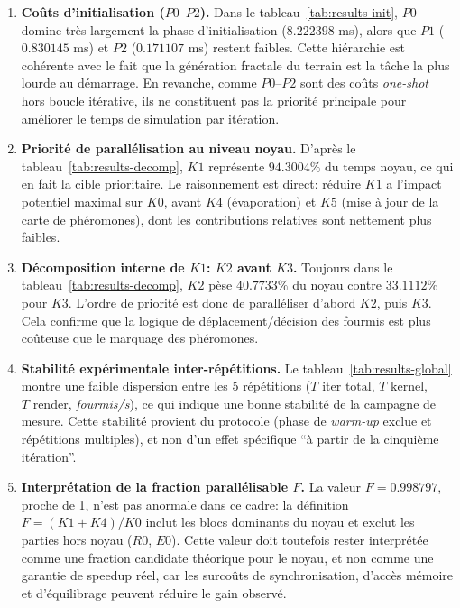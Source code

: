 \begin{enumerate}[leftmargin=*]
    \item \textbf{Coûts d'initialisation (\(P0\text{--}P2\)).}
    Dans le tableau~\ref{tab:results-init}, \(P0\) domine très largement la phase
    d'initialisation (\(8.222398\) ms), alors que \(P1\)
    (\(0.830145\) ms) et \(P2\) (\(0.171107\) ms) restent faibles. Cette hiérarchie est cohérente
    avec le fait que la génération fractale du terrain est la tâche la plus lourde au démarrage.
    En revanche, comme \(P0\text{--}P2\) sont des coûts \textit{one-shot} hors boucle itérative,
    ils ne constituent pas la priorité principale pour améliorer le temps de simulation par itération.

    \item \textbf{Priorité de parallélisation au niveau noyau.}
    D'après le tableau~\ref{tab:results-decomp}, \(K1\) représente \(94.3004\%\) du temps noyau,
    ce qui en fait la cible prioritaire.
    Le raisonnement est direct: réduire \(K1\) a l'impact potentiel maximal sur \(K0\),
    avant \(K4\) (évaporation) et \(K5\) (mise à jour de la carte de phéromones), dont les
    contributions relatives sont nettement plus faibles.

    \item \textbf{Décomposition interne de \(K1\): \(K2\) avant \(K3\).}
    Toujours dans le tableau~\ref{tab:results-decomp}, \(K2\) pèse \(40.7733\%\) du noyau contre
    \(33.1112\%\) pour \(K3\).
    L'ordre de priorité est donc de paralléliser d'abord \(K2\), puis \(K3\).
    Cela confirme que la logique de déplacement/décision des fourmis est plus coûteuse que le
    marquage des phéromones.

    \item \textbf{Stabilité expérimentale inter-répétitions.}
    Le tableau~\ref{tab:results-global} montre une faible dispersion entre les 5 répétitions
    (\(T\_\text{iter\_total}\), \(T\_\text{kernel}\), \(T\_\text{render}\), \textit{fourmis/s}),
    ce qui indique une bonne stabilité de la campagne de mesure. Cette stabilité provient du protocole
    (phase de \textit{warm-up} exclue et répétitions multiples), et non d'un effet spécifique
    ``à partir de la cinquième itération''.

    \item \textbf{Interprétation de la fraction parallélisable \(F\).}
    La valeur \(F = 0.998797\), proche de 1, n'est pas anormale dans ce cadre:
    la définition \(F=(K1+K4)/K0\) inclut les blocs dominants du noyau et exclut les
    parties hors noyau (\(R0\), \(E0\)). Cette valeur doit toutefois rester interprétée
    comme une fraction candidate théorique pour le noyau, et non comme une garantie de
    speedup réel, car les surcoûts de synchronisation, d'accès mémoire et d'équilibrage
    peuvent réduire le gain observé.


\end{enumerate}
